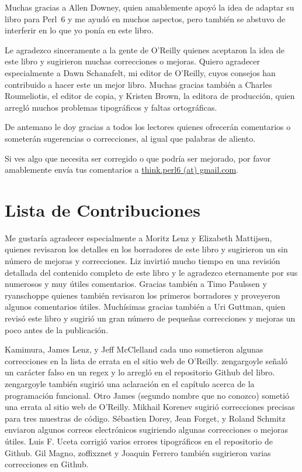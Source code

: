 Muchas gracias a Allen Downey, quien amablemente apoyó la idea
de adaptar su libro para Perl~6 y me ayudó en muchos aspectos,
pero también se abstuvo de interferir en lo que yo ponía en este
libro.

Le agradezco sinceramente a la gente de O'Reilly quienes 
aceptaron la idea de este libro y sugirieron muchas correcciones o 
mejoras. Quiero agradecer especialmente a Dawn Schanafelt, mi editor de 
O'Reilly, cuyos consejos han contribuido a hacer este un mejor libro.
Muchas gracias también a Charles Roumeliotis, el editor de copia, y 
Kristen Brown, la editora de producción, quien arregló muchos problemas
tipográficos y faltas ortográficas.

De antemano le doy gracias a todos los lectores quienes ofrecerán comentarios
o someterán sugerencias o correcciones, al igual que palabras de aliento.

Si ves algo que necesita ser corregido o que podría ser mejorado,
por favor amablemente envía tus comentarios a 
\url{think.perl6 (at) gmail.com}.


\section*{Lista de Contribuciones}

Me gustaría agradecer especialmente a Moritz Lenz y Elizabeth 
Mattijsen, quienes revisaron los detalles en los borradores de este 
libro y sugirieron un sin número de mejoras y correcciones.
Liz invirtió mucho tiempo en una revisión detallada del contenido
completo de este libro y le agradezco eternamente por sus numerosos
y muy útiles comentarios. Gracias también a Timo Paulssen y ryanschoppe quienes
también revisaron los primeros borradores y proveyeron algunos comentarios
útiles. Muchísimas gracias también a Uri Guttman, quien revisó este libro
y sugirió un gran número de pequeñas correcciones y mejoras un poco antes
de la publicación.  

Kamimura, James Lenz, y Jeff McClelland cada uno sometieron algunas correcciones
en la lista de errata en el sitio web de O'Reilly. zengargoyle señaló un carácter
falso en un regex y lo arregló en el repositorio Github del libro. zengargoyle
también sugirió una aclaración en el capítulo acerca de la programación
funcional. Otro James (segundo nombre que no conozco) sometió una errata
al sitio web de O'Reilly. Mikhail Korenev sugirió correcciones precisas
para tres muestras de código. Sébastien Dorey, Jean Forget, y Roland Schmitz 
enviaron algunos correos electrónicos sugiriendo algunas correcciones o mejoras útiles. 
Luis F. Uceta corrigió varios errores tipográficos en el repositorio
de Github. Gil Magno, zoffixznet y Joaquin Ferrero también sugirieron
varias correcciones en Github.
\clearemptydoublepage

\begin{latexonly}

\tableofcontents

\clearemptydoublepage

\end{latexonly}

